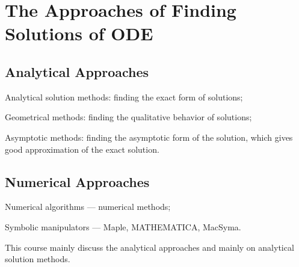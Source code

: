 \documentclass[letterpaper]{article}
\begin{document}
\section{The Approaches of Finding Solutions of ODE}

 \subsection{Analytical Approaches}
 \bitem
 \item
 Analytical solution methods: finding the exact form of solutions;
 \item
 Geometrical methods: finding the qualitative behavior of
 solutions;
 \item
 Asymptotic methods: finding the asymptotic form of the solution,
 which gives good approximation of the exact solution.
\eitem

 \subsection{ Numerical Approaches}
 \bitem
\item
Numerical algorithms --- numerical methods;
\item
Symbolic manipulators --- Maple, MATHEMATICA, MacSyma.

 \eitem


This course mainly discuss the analytical approaches and mainly on
analytical solution methods.
\end{document}
